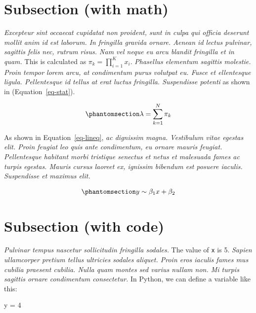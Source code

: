 \documentclass[
  a4paper,
]{scrbook}
\newenvironment{Shaded}{\begin{snugshade}}{\end{snugshade}}
\newcommand{\DecValTok}[1]{\textcolor[rgb]{0.69,0.50,0.00}{#1}}
\newcommand{\NormalTok}[1]{\textcolor[rgb]{0.12,0.11,0.11}{#1}}
\newcommand{\OperatorTok}[1]{\textcolor[rgb]{0.12,0.11,0.11}{#1}}
\begin{document}
\section{Subsection (with math)}\label{subsection-with-math}

\emph{Excepteur sint occaecat cupidatat non proident, sunt in culpa qui
officia deserunt mollit anim id est laborum. In fringilla gravida
ornare. Aenean id lectus pulvinar, sagittis felis nec, rutrum risus. Nam
vel neque eu arcu blandit fringilla et in quam.} This is calculated as
\(\pi_k = \prod_{i=1}^K x_i\). \emph{Phasellus elementum sagittis
molestie. Proin tempor lorem arcu, at condimentum purus volutpat eu.
Fusce et ellentesque ligula. Pellentesque id tellus at erat luctus
fringilla. Suspendisse potenti} as shown in (Equation~\ref{eq-stat}).

\begin{equation}\phantomsection\label{eq-stat}{
\lambda = \sum_{k=1}^N \pi_k
}\end{equation}

As shown in Equation~\ref{eq-lineq}, \emph{ac dignissim magna.
Vestibulum vitae egestas elit. Proin feugiat leo quis ante condimentum,
eu ornare mauris feugiat. Pellentesque habitant morbi tristique senectus
et netus et malesuada fames ac turpis egestas. Mauris cursus laoreet ex,
ignissim bibendum est posuere iaculis. Suspendisse et maximus elit.}

\begin{equation}\phantomsection\label{eq-lineq}{
y \sim \beta_1 x + \beta_2
}\end{equation}

\section{Subsection (with code)}\label{subsection-with-code}

\emph{Pulvinar tempus nascetur sollicitudin fringilla sodales.} The
value of \texttt{x} is 5. \emph{Sapien ullamcorper pretium tellus
ultricies sodales aliquet. Proin eros iaculis fames mus cubilia praesent
cubilia. Nulla quam montes sed varius nullam non. Mi turpis sagittis
ornare condimentum consectetur.} In Python, we can define a variable
like this:

\begin{Shaded}
\begin{Highlighting}[]
\NormalTok{y }\OperatorTok{=} \DecValTok{4}
\end{Highlighting}
\end{Shaded}
\end{document}
